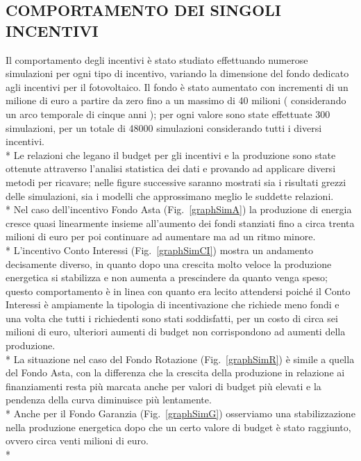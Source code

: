 \documentclass[12pt,a4paper,openright,twoside]{report}
\begin{document}
\subsection{COMPORTAMENTO DEI SINGOLI INCENTIVI}
Il comportamento degli incentivi è stato studiato effettuando numerose simulazioni per ogni tipo di incentivo, variando la dimensione del fondo dedicato agli incentivi per il fotovoltaico. Il fondo è stato aumentato con incrementi di un milione di euro a partire da zero  fino a un massimo di 40 milioni ( considerando un arco temporale di cinque anni ); per ogni valore sono state effettuate 300 simulazioni, per un totale di 48000 simulazioni considerando tutti i diversi incentivi.\\*
Le relazioni che legano il budget per gli incentivi e la produzione sono state ottenute attraverso l'analisi statistica dei dati e provando ad applicare diversi metodi per ricavare; nelle figure successive saranno mostrati sia i risultati grezzi delle simulazioni, sia i modelli che approssimano meglio le suddette relazioni.  \\*
Nel caso dell'incentivo Fondo Asta (Fig.~\ref{graphSimA}) la produzione di energia cresce quasi linearmente insieme all'aumento dei fondi stanziati fino a circa trenta milioni di euro per poi continuare ad aumentare ma ad un ritmo minore. \\*
L'incentivo Conto Interessi (Fig.~\ref{graphSimCI}) mostra un andamento decisamente diverso, in quanto dopo una crescita molto veloce la produzione energetica si stabilizza e non aumenta a prescindere da quanto venga speso; questo comportamento è in linea con quanto era lecito attendersi poiché il Conto Interessi è ampiamente la tipologia di incentivazione che richiede meno fondi e una volta che tutti i richiedenti sono stati soddisfatti, per un costo di circa sei milioni di euro, ulteriori aumenti di budget non corrispondono ad aumenti della produzione.\\*
La situazione nel caso del Fondo Rotazione (Fig.~\ref{graphSimR}) è simile a quella del Fondo Asta, con la differenza che la crescita della produzione in relazione ai finanziamenti resta più marcata anche per valori di budget più elevati e la pendenza della curva diminuisce più lentamente.\\*
Anche per il Fondo Garanzia (Fig.~\ref{graphSimG}) osserviamo una stabilizzazione nella produzione energetica dopo che un certo valore di budget è stato raggiunto, ovvero circa venti milioni di euro.\\*
\end{document}
